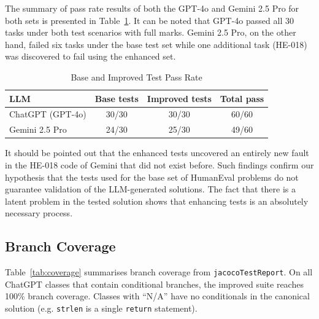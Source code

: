 \documentclass[journal]{IEEEtran}
\begin{document}
The summary of pass rate results of both the GPT-4o and Gemini 2.5 Pro for both sets is presented in Table~\ref{tab:pass-rate}. It can be noted that GPT-4o passed all 30 tasks under both test scenarios with full marks. Gemini 2.5 Pro, on the other hand, failed six tasks under the base test set while one additional task (HE-018) was discovered to fail using the enhanced set.

\begin{table}[h]
\centering
\caption{Base and Improved Test Pass Rate}
\label{tab:pass-rate}
\begin{tabular}{lccc}
\toprule
LLM & Base tests & Improved tests & Total pass \\
\midrule
ChatGPT (GPT-4o) & 30/30 & 30/30 & 60/60 \\
Gemini 2.5 Pro   & 24/30 & 25/30 & 49/60 \\
\bottomrule
\end{tabular}
\end{table}

It should be pointed out that the enhanced tests uncovered an entirely new fault in the HE-018 code of Gemini that did not exist before. Such findings confirm our hypothesis that the tests used for the base set of HumanEval problems do not guarantee validation of the LLM-generated solutions. The fact that there is a latent problem in the tested solution shows that enhancing tests is an absolutely necessary process.

\subsection{Branch Coverage}
Table~\ref{tab:coverage} summarises branch coverage from
\texttt{jacocoTestReport}. On all ChatGPT classes that contain conditional
branches, the improved suite reaches 100\% branch coverage. Classes with
``N/A'' have no conditionals in the canonical solution (e.g.
\texttt{strlen} is a single \texttt{return} statement).
\end{document}

